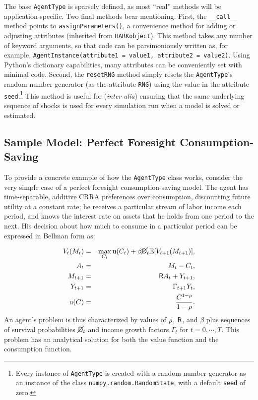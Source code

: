 \documentclass[12pt,titlepage,letterpaper]{econtex}
\newcommand{\E}{\mathbb{E}}
\begin{document}
The base \texttt{AgentType} is sparsely defined, as most ``real'' methods will be application-specific.  Two final methods bear mentioning.  First, the \texttt{\_\_call\_\_} method points to \texttt{assignParameters()}, a convenience method for adding or adjusting attributes (inherited from \texttt{HARKobject}).  This method takes any number of keyword arguments, so that code can be parsimoniously written as, for example, \texttt{AgentInstance(attribute1 = value1, attribute2 = value2)}.  Using Python's dictionary capabilities, many attributes can be conveniently set with minimal code.  Second, the \texttt{resetRNG} method simply resets the \texttt{AgentType}'s random number generator (as the attribute \texttt{RNG}) using the value in the attribute \texttt{seed}.\footnote{Every instance of \texttt{AgentType} is created with a random number generator as an instance of the class \texttt{numpy.random.RandomState}, with a default \texttt{seed} of zero.}  This method is useful for (\textit{inter alia}) ensuring that the same underlying sequence of shocks is used for every simulation run when a model is solved or estimated.


\subsection{Sample Model: Perfect Foresight Consumption-Saving}\label{sec:PerfectForesight}

To provide a concrete example of how the \texttt{AgentType} class works, consider the very simple case of a perfect foresight consumption-saving model.  The agent has time-separable, additive CRRA preferences over consumption, discounting future utility at a constant rate; he receives a particular stream of labor income each period, and knows the interest rate on assets that he holds from one period to the next.  His decision about how much to consume in a particular period can be expressed in Bellman form as:

\begin{eqnarray*}
V_t(M_t) &=& \max_{C_t} \utilFunc(C_t) + \beta \PLives_t \E [V_{t+1}(M_{t+1}) ], \\
A_t &=& M_t - C_t, \\
M_{t+1} &=& \Rfree A_t + Y_{t+1}, \\
Y_{t+1} &=& \Gamma_{t+1} Y_t, \\
\utilFunc(C) &=& \frac{C^{1-\CRRA}}{1-\CRRA}.
\end{eqnarray*}
An agent's problem is thus characterized by values of $\rho$, $\mathsf{R}$,  and $\beta$ plus sequences of survival probabilities $\cancel{\mathsf{D}}_t$ and income growth factors $\Gamma_t$ for $t=0,\cdots,T$.  This problem has an analytical solution for both the value function and the consumption function.
\end{document}
